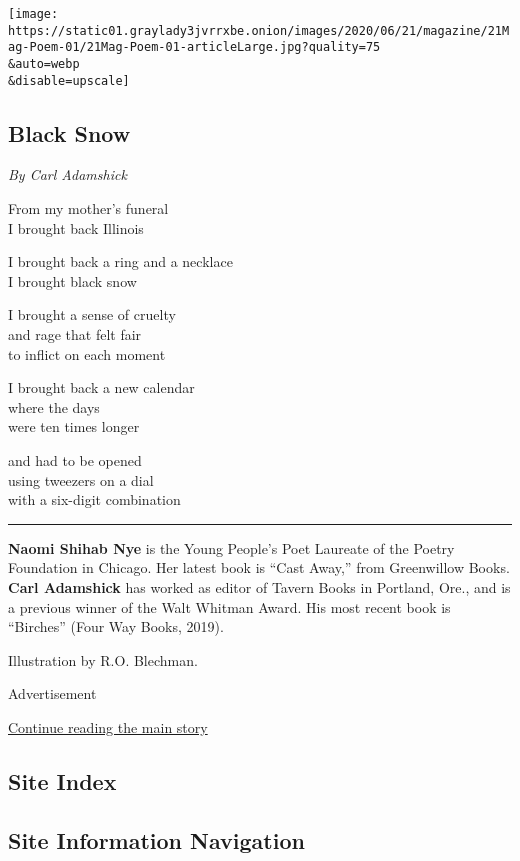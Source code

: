 \texttt{[image: https://static01.graylady3jvrrxbe.onion/images/2020/06/21/magazine/21Mag-Poem-01/21Mag-Poem-01-articleLarge.jpg?quality=75\\\&auto=webp\\\&disable=upscale]}

\hypertarget{black-snow}{%
\subsection{Black Snow}\label{black-snow}}

\emph{By Carl Adamshick}

From my mother's funeral\\
I brought back Illinois

I brought back a ring and a necklace\\
I brought black snow

I brought a sense of cruelty\\
and rage that felt fair\\
to inflict on each moment

I brought back a new calendar\\
where the days\\
were ten times longer

and had to be opened\\
using tweezers on a dial\\
with a six-digit combination

\begin{center}\rule{0.5\linewidth}{\linethickness}\end{center}

\textbf{Naomi Shihab Nye} is the Young People's Poet Laureate of the
Poetry Foundation in Chicago. Her latest book is ``Cast Away,'' from
Greenwillow Books. \textbf{Carl Adamshick} has worked as editor of
Tavern Books in Portland, Ore., and is a previous winner of the Walt
Whitman Award. His most recent book is ``Birches'' (Four Way Books,
2019).

Illustration by R.O. Blechman.

Advertisement

\protect\hyperlink{after-bottom}{Continue reading the main story}

\hypertarget{site-index}{%
\subsection{Site Index}\label{site-index}}

\hypertarget{site-information-navigation}{%
\subsection{Site Information
Navigation}\label{site-information-navigation}}


